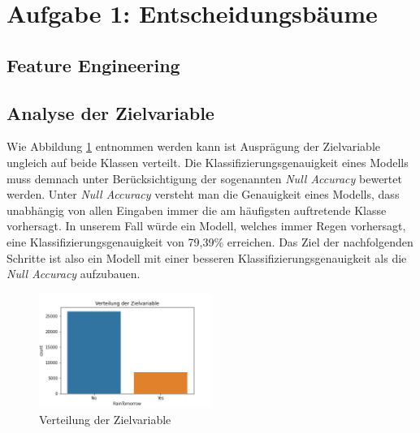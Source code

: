 \section{Aufgabe 1: Entscheidungsbäume}
\subsection{Feature Engineering}

\subsection{Analyse der Zielvariable}
Wie Abbildung \ref{fig:disc_target_variable} entnommen werden kann ist Ausprägung der Zielvariable ungleich auf beide Klassen verteilt. Die Klassifizierungsgenauigkeit eines Modells muss demnach unter Berücksichtigung der sogenannten \emph{Null Accuracy} bewertet werden. Unter \emph{Null Accuracy} versteht man die Genauigkeit eines Modells, dass unabhängig von allen Eingaben immer die am häufigsten auftretende Klasse vorhersagt. In unserem Fall würde ein Modell, welches immer Regen vorhersagt, eine Klassifizierungsgenauigkeit von 79,39\% erreichen. Das Ziel der nachfolgenden Schritte ist also ein Modell mit einer besseren Klassifizierungsgenauigkeit als die \emph{Null Accuracy} aufzubauen.
\begin{figure}[ht]
	\centering
	\includegraphics[width = 0.5\textwidth]{Bilder/distribution_target_variable.png}
	\caption{Verteilung der Zielvariable}
	\label{fig:disc_target_variable}
\end{figure}
